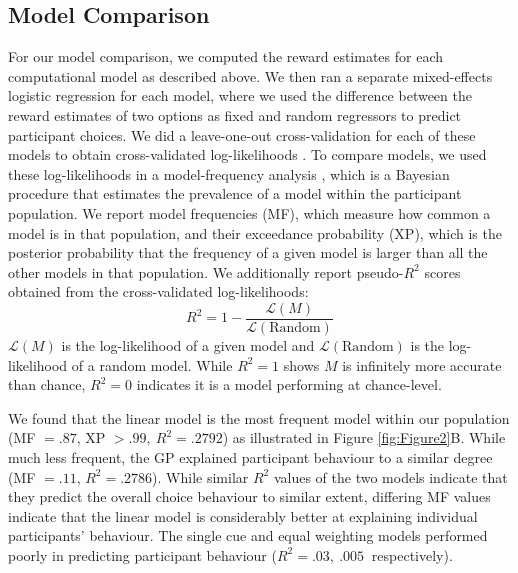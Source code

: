 \documentclass[10pt]{article}
\begin{document}
\subsection{Model Comparison}

For our model comparison, we computed the reward estimates for each computational model as described above. We then ran a separate mixed-effects logistic regression for each model, where we used the difference between the reward estimates of two options as fixed and random regressors to predict participant choices. We did a leave-one-out cross-validation for each of these models to obtain cross-validated log-likelihoods \citep{garvert_hippocampal_2021}. To compare models, we used these log-likelihoods in a model-frequency analysis \citep{stephan_bayesian_2009,rigoux_bayesian_2014}, which is a Bayesian procedure that estimates the prevalence of a model within the participant population. We report model frequencies (MF), which measure how common a model is in that population, and their exceedance probability (XP), which is the posterior probability that the frequency of a given model is larger than all the other models in that population. We additionally report pseudo-$R^2$ scores \citep{mcfadden_conditional_1974} obtained from the  cross-validated log-likelihoods:
\begin{equation*}
    R^2 = 1 -\dfrac{\mathcal{L}(M)}{\mathcal{L}(\text{Random})}
\end{equation*}
$\mathcal{L}(M)$ is the log-likelihood of a given model and $\mathcal{L}(\text{Random})$ is the log-likelihood of a random model. While $R^2 = 1$ shows $M$ is infinitely more accurate than chance, $R^2 = 0$ indicates it is a model performing at chance-level.

We found that the linear model is the most frequent model within our population (MF $= .87$, XP $>.99, \: R^2=.2792$) as illustrated in Figure \ref{fig:Figure2}B. While much less frequent, the GP explained participant behaviour to a similar degree (MF $= .11$, $R^2=.2786$). While similar $R^2$ values of the two models indicate that they predict the overall choice behaviour to similar extent, differing MF values indicate that the linear model is considerably better at explaining individual participants' behaviour. The single cue and equal weighting models performed poorly in predicting participant behaviour ($R^2 = .03, \: .005 \: $ respectively).
\end{document}
